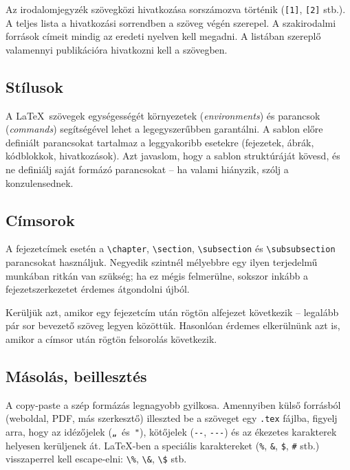 \documentclass{sapientia-thesis}
\begin{document}
Az irodalomjegyzék szövegközi hivatkozása sorszámozva történik (\texttt{[1]}, \texttt{[2]} stb.). A teljes lista a hivatkozási sorrendben a szöveg végén szerepel. A szakirodalmi források címeit mindig az eredeti nyelven kell megadni. A listában szereplő valamennyi publikációra hivatkozni kell a szövegben.

\subsection{Stílusok}
A \LaTeX\ szövegek egységességét környezetek (\textit{environments}) és parancsok (\textit{commands}) segítségével lehet a legegyszerűbben garantálni. A sablon előre definiált parancsokat tartalmaz a leggyakoribb esetekre (fejezetek, ábrák, kódblokkok, hivatkozások). Azt javaslom, hogy a sablon struktúráját kövesd, és ne definiálj saját formázó parancsokat -- ha valami hiányzik, szólj a konzulensednek.

\subsection{Címsorok}
A fejezetcímek esetén a \verb|\chapter|, \verb|\section|, \verb|\subsection| és \verb|\subsubsection| parancsokat használjuk. Negyedik szintnél mélyebbre egy ilyen terjedelmű munkában ritkán van szükség; ha ez mégis felmerülne, sokszor inkább a fejezetszerkezetet érdemes átgondolni újból.

Kerüljük azt, amikor egy fejezetcím után rögtön alfejezet következik -- legalább pár sor bevezető szöveg legyen közöttük. Hasonlóan érdemes elkerülnünk azt is, amikor a címsor után rögtön felsorolás következik.

\subsection{Másolás, beillesztés}
A copy-paste a szép formázás legnagyobb gyilkosa. Amennyiben külső forrásból (weboldal, PDF, más szerkesztő) illeszted be a szöveget egy \texttt{.tex} fájlba, figyelj arra, hogy az idézőjelek (\verb|„|~és~\verb|"|), kötőjelek (\verb|--|, \verb|---|) és az ékezetes karakterek helyesen kerüljenek át. \LaTeX-ben a speciális karaktereket (\verb|%|, \verb|&|, \verb|$|, \verb|#| stb.) visszaperrel kell escape-elni: \verb|\%|, \verb|\&|, \verb|\$| stb.
\end{document}
